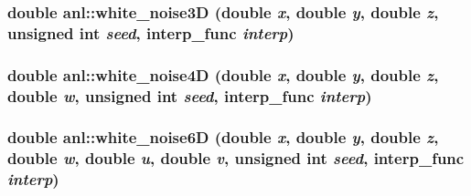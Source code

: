 \label{namespaceanl_abe4c05c9d3bf651fedbb1c143283c662}
\hypertarget{namespaceanl_a824656324d25886d98d4ee327db1a28e}{
\subsubsection[{white\_\-noise3D}]{\setlength{\rightskip}{0pt plus 5cm}double anl::white\_\-noise3D (double {\em x}, \/  double {\em y}, \/  double {\em z}, \/  unsigned int {\em seed}, \/  interp\_\-func {\em interp})}}
\label{namespaceanl_a824656324d25886d98d4ee327db1a28e}
\hypertarget{namespaceanl_a91cc8329cfa4e902aa4fd64dd7291d47}{
\subsubsection[{white\_\-noise4D}]{\setlength{\rightskip}{0pt plus 5cm}double anl::white\_\-noise4D (double {\em x}, \/  double {\em y}, \/  double {\em z}, \/  double {\em w}, \/  unsigned int {\em seed}, \/  interp\_\-func {\em interp})}}
\label{namespaceanl_a91cc8329cfa4e902aa4fd64dd7291d47}
\hypertarget{namespaceanl_a475918080d70d295888ca405a82b5435}{
\subsubsection[{white\_\-noise6D}]{\setlength{\rightskip}{0pt plus 5cm}double anl::white\_\-noise6D (double {\em x}, \/  double {\em y}, \/  double {\em z}, \/  double {\em w}, \/  double {\em u}, \/  double {\em v}, \/  unsigned int {\em seed}, \/  interp\_\-func {\em interp})}}
\label{namespaceanl_a475918080d70d295888ca405a82b5435}


